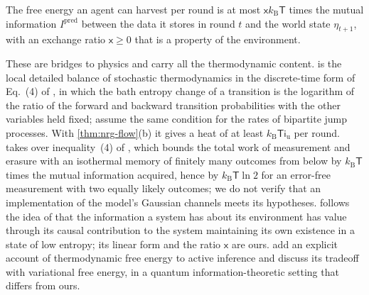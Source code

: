 \begin{premise}[Resource]\label{prem:nrg-resource}
The free energy an agent can harvest per round is at most $\mathsf xk_{\mathrm B}\mathsf T$ times the mutual information $I^{\mathrm{pred}}$ between the data it stores in round $t$ and the world state $\eta_{t+1}$, with an exchange ratio $\mathsf x\ge0$ that is a property of the environment.
\end{premise}

These are bridges to physics and carry all the thermodynamic content.  is the local detailed balance of stochastic thermodynamics in the discrete-time form of Eq.~(4) of \citet{ito2013information}, in which the bath entropy change of a transition is the logarithm of the ratio of the forward and backward transition probabilities with the other variables held fixed; \citet{horowitz2014thermodynamics} assume the same condition for the rates of bipartite jump processes. With \cref{thm:nrg-flow}(b) it gives a heat of at least $k_{\mathrm B}\mathsf T\mathsf i_{\mathrm u}$ per round.  takes over inequality~(4) of \citet{sagawa2009minimal}, which bounds the total work of measurement and erasure with an isothermal memory of finitely many outcomes from below by $k_{\mathrm B}\mathsf T$ times the mutual information acquired, hence by $k_{\mathrm B}\mathsf T\ln2$ for an error-free measurement with two equally likely outcomes; we do not verify that an implementation of the model's Gaussian channels meets its hypotheses.  follows the idea of \citet{kolchinsky2018semantic} that the information a system has about its environment has value through its causal contribution to the system maintaining its own existence in a state of low entropy; its linear form and the ratio $\mathsf x$ are ours. \citet{fields2024making} add an explicit account of thermodynamic free energy to active inference and discuss its tradeoff with variational free energy, in a quantum information-theoretic setting that differs from ours.

